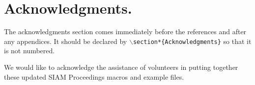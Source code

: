 \documentclass[twoside,leqno]{article}
\begin{document}
\section*{Acknowledgments.}
The acknowledgments section comes
immediately before the references and after any appendices. It should
be declared by $\backslash$\texttt{section*\{Acknowledgments\}} so that it is not numbered.

We would like to acknowledge the assistance of volunteers in putting
together these updated SIAM Proceedings macros and example files.



\end{document}
